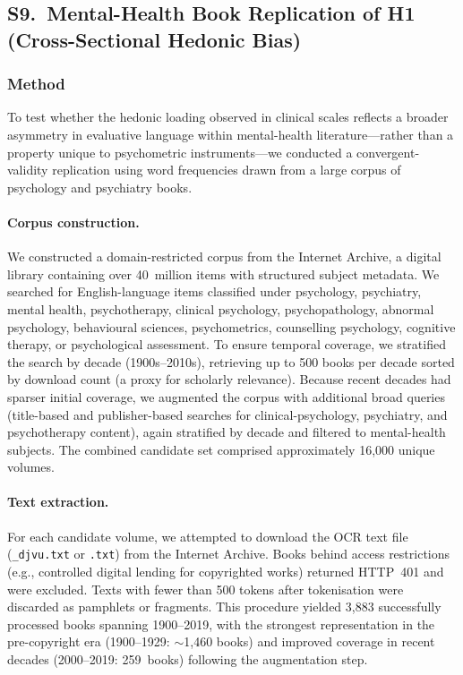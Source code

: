 \documentclass[12pt,a4paper]{article}
\begin{document}
\clearpage
\subsection*{S9.\ Mental-Health Book Replication of H1 (Cross-Sectional Hedonic Bias)}
\label{sec:s_ngram_h1}

\subsubsection*{Method}

To test whether the hedonic loading observed in clinical scales reflects a broader asymmetry in evaluative language within mental-health literature---rather than a property unique to psychometric instruments---we conducted a convergent-validity replication using word frequencies drawn from a large corpus of psychology and psychiatry books.

\paragraph{Corpus construction.}
We constructed a domain-restricted corpus from the Internet Archive, a digital library containing over 40~million items with structured subject metadata.
We searched for English-language items classified under psychology, psychiatry, mental health, psychotherapy, clinical psychology, psychopathology, abnormal psychology, behavioural sciences, psychometrics, counselling psychology, cognitive therapy, or psychological assessment.
To ensure temporal coverage, we stratified the search by decade (1900s--2010s), retrieving up to 500 books per decade sorted by download count (a proxy for scholarly relevance).
Because recent decades had sparser initial coverage, we augmented the corpus with additional broad queries (title-based and publisher-based searches for clinical-psychology, psychiatry, and psychotherapy content), again stratified by decade and filtered to mental-health subjects.
The combined candidate set comprised approximately 16{,}000 unique volumes.

\paragraph{Text extraction.}
For each candidate volume, we attempted to download the OCR text file (\texttt{\_djvu.txt} or \texttt{.txt}) from the Internet Archive.
Books behind access restrictions (e.g., controlled digital lending for copyrighted works) returned HTTP~401 and were excluded.
Texts with fewer than 500 tokens after tokenisation were discarded as pamphlets or fragments.
This procedure yielded 3{,}883 successfully processed books spanning 1900--2019, with the strongest representation in the pre-copyright era (1900--1929: $\sim$1{,}460 books) and improved coverage in recent decades (2000--2019: 259~books) following the augmentation step.
\end{document}
